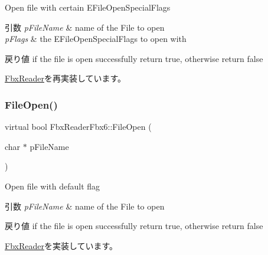 Open file with certain E\+File\+Open\+Special\+Flags 
\begin{DoxyParams}{引数}
{\em p\+File\+Name} & name of the File to open \\
\hline
{\em p\+Flags} & the E\+File\+Open\+Special\+Flags to open with \\
\hline
\end{DoxyParams}
\begin{DoxyReturn}{戻り値}
if the file is open successfully return true, otherwise return false 
\end{DoxyReturn}


\hyperlink{class_fbx_reader_a345b292805ea8799a9d962714e1ad9a5}{Fbx\+Reader}を再実装しています。

\mbox{\label{class_fbx_reader_fbx6_aae8a88d85353be67413ce60a27873422}} 
\subsubsection{\texorpdfstring{File\+Open()}{FileOpen()}\hspace{0.1cm}{\footnotesize\ttfamily [2/4]}}
{\footnotesize\ttfamily virtual bool Fbx\+Reader\+Fbx6\+::\+File\+Open (\begin{DoxyParamCaption}\item[{char $\ast$}]{p\+File\+Name }\end{DoxyParamCaption})\hspace{0.3cm}{\ttfamily [virtual]}}

Open file with default flag 
\begin{DoxyParams}{引数}
{\em p\+File\+Name} & name of the File to open \\
\hline
\end{DoxyParams}
\begin{DoxyReturn}{戻り値}
if the file is open successfully return {\ttfamily true}, otherwise return {\ttfamily false} 
\end{DoxyReturn}


\hyperlink{class_fbx_reader_a6105bd37ae86c03f35aee6f62901856d}{Fbx\+Reader}を実装しています。

\mbox{\label{class_fbx_reader_fbx6_a9f3d0e6b7722581f2028be9b94f1b933}} 
